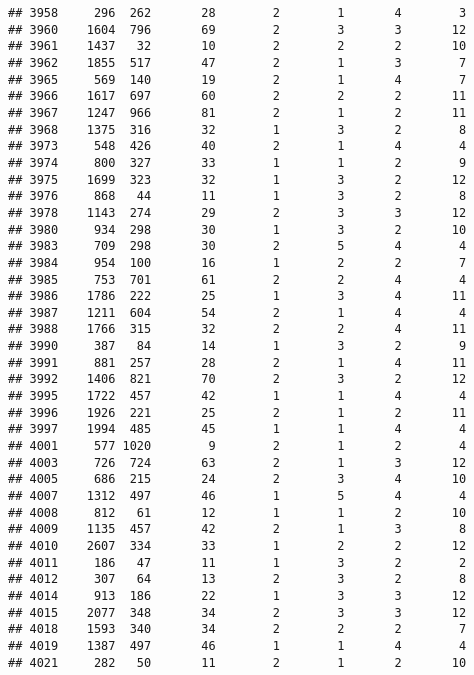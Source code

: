 \documentclass[]{article}
\begin{document}
\begin{verbatim}
## 3958     296  262       28        2        1       4        3
## 3960    1604  796       69        2        3       3       12
## 3961    1437   32       10        2        2       2       10
## 3962    1855  517       47        2        1       3        7
## 3965     569  140       19        2        1       4        7
## 3966    1617  697       60        2        2       2       11
## 3967    1247  966       81        2        1       2       11
## 3968    1375  316       32        1        3       2        8
## 3973     548  426       40        2        1       4        4
## 3974     800  327       33        1        1       2        9
## 3975    1699  323       32        1        3       2       12
## 3976     868   44       11        1        3       2        8
## 3978    1143  274       29        2        3       3       12
## 3980     934  298       30        1        3       2       10
## 3983     709  298       30        2        5       4        4
## 3984     954  100       16        1        2       2        7
## 3985     753  701       61        2        2       4        4
## 3986    1786  222       25        1        3       4       11
## 3987    1211  604       54        2        1       4        4
## 3988    1766  315       32        2        2       4       11
## 3990     387   84       14        1        3       2        9
## 3991     881  257       28        2        1       4       11
## 3992    1406  821       70        2        3       2       12
## 3995    1722  457       42        1        1       4        4
## 3996    1926  221       25        2        1       2       11
## 3997    1994  485       45        1        1       4        4
## 4001     577 1020        9        2        1       2        4
## 4003     726  724       63        2        1       3       12
## 4005     686  215       24        2        3       4       10
## 4007    1312  497       46        1        5       4        4
## 4008     812   61       12        1        1       2       10
## 4009    1135  457       42        2        1       3        8
## 4010    2607  334       33        1        2       2       12
## 4011     186   47       11        1        3       2        2
## 4012     307   64       13        2        3       2        8
## 4014     913  186       22        1        3       3       12
## 4015    2077  348       34        2        3       3       12
## 4018    1593  340       34        2        2       2        7
## 4019    1387  497       46        1        1       4        4
## 4021     282   50       11        2        1       2       10

\end{verbatim}
\end{document}
